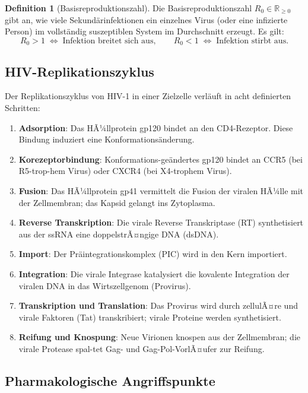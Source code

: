 ﻿\documentclass[a4paper,12pt]{article}
\theoremstyle{definition}
\newtheorem{definition}{Definition}
\begin{document}
\begin{definition}[Basisreproduktionszahl]
Die Basisreproduktionszahl $R_0 \in \mathbb{R}_{\geq 0}$ gibt an, wie viele Sekund\"arinfektionen
ein einzelnes Virus (oder eine infizierte Person) im vollst\"andig suszeptiblen System
im Durchschnitt erzeugt. Es gilt:
\[
R_0 > 1 \;\Leftrightarrow\; \text{Infektion breitet sich aus}, \qquad
R_0 < 1 \;\Leftrightarrow\; \text{Infektion stirbt aus}.
\]
\end{definition}

\subsection{HIV-Replikationszyklus}

Der Replikationszyklus von HIV-1 in einer Zielzelle verl\"auft in acht definierten Schritten:

\begin{enumerate}
\item \textbf{Adsorption}: Das HÃ¼llprotein gp120 bindet an den CD4-Rezeptor.
      Diese Bindung induziert eine Konformations\"anderung.
\item \textbf{Korezeptorbindung}: Konformations-ge\"andertes gp120 bindet an CCR5
      (bei R5-trop-hem Virus) oder CXCR4 (bei X4-trophem Virus).
\item \textbf{Fusion}: Das HÃ¼llprotein gp41 vermittelt die Fusion der viralen HÃ¼lle
      mit der Zellmembran; das Kapsid gelangt ins Zytoplasma.
\item \textbf{Reverse Transkription}: Die virale Reverse Transkriptase (RT) synthetisiert
      aus der ssRNA eine doppelstrÃ¤ngige DNA (dsDNA).
\item \textbf{Import}: Der Pr\"aintegrationskomplex (PIC) wird in den Kern importiert.
\item \textbf{Integration}: Die virale Integrase katalysiert die kovalente Integration
      der viralen DNA in das Wirtszellgenom (Provirus).
\item \textbf{Transkription und Translation}: Das Provirus wird durch zellulÃ¤re und virale
      Faktoren (Tat) transkribiert; virale Proteine werden synthetisiert.
\item \textbf{Reifung und Knospung}: Neue Virionen knospen aus der Zellmembran;
      die virale Protease spal-tet Gag- und Gag-Pol-VorlÃ¤ufer zur Reifung.
\end{enumerate}

\subsection{Pharmakologische Angriffspunkte}
\end{document}
